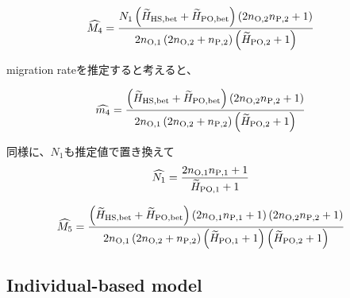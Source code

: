 \documentclass[AMA,STIX1COL]{WileyNJD-v2}
\begin{document}
\begin{align}
\widehat{M_4} &=  \frac{ N_{1} \left(\widetilde{H}_{\rm HS,bet} + \widetilde{H}_{\rm PO,bet}\right) \left(2 n_{\rm O, 2} n_{\rm P, 2} + 1\right)} {2n_{\rm O, 1} \left(2 n_{\rm O, 2} + n_{\rm P, 2}\right) \left(\widetilde{H}_{\rm PO, 2} + 1\right)}
\label{AP-4}
\end{align}

migration rateを推定すると考えると、

\begin{align}
\widehat{m_4} &=  \frac{ \left(\widetilde{H}_{\rm HS,bet} + \widetilde{H}_{\rm PO,bet}\right) \left(2 n_{\rm O, 2} n_{\rm P, 2} + 1\right)} {2n_{\rm O, 1} \left(2 n_{\rm O, 2} + n_{\rm P, 2}\right) \left(\widetilde{H}_{\rm PO, 2} + 1\right)}
\label{AP-5}
\end{align}

同様に、$N_1$も推定値で置き換えて
\begin{align}
\widehat{N_1} &= \frac{ 2 n_{\rm O, 1} n_{\rm P, 1} + 1 }{\widetilde{H}_{\rm PO, 1} + 1} 
\label{AP-6}
\end{align}

\begin{align}
\widehat{M_5} &=  \frac{ \left(\widetilde{H}_{\rm HS,bet} + \widetilde{H}_{\rm PO,bet}\right) \left(2 n_{\rm O, 1} n_{\rm P, 1} + 1\right) \left(2 n_{\rm O, 2} n_{\rm P, 2} + 1\right)} {2n_{\rm O, 1} \left(2 n_{\rm O, 2} + n_{\rm P, 2}\right) \left(\widetilde{H}_{\rm PO, 1} + 1\right) \left(\widetilde{H}_{\rm PO, 2} + 1\right)}
\label{AP-7}
\end{align}

\subsection{Individual-based model}
\end{document}
